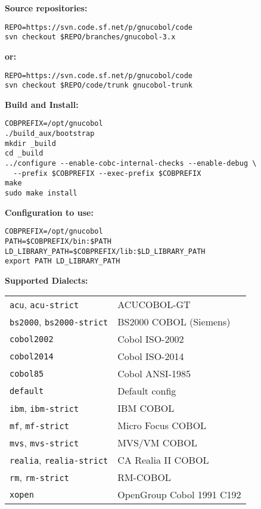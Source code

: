 \documentclass[10pt,landscape]{article}
\begin{document}
\begin{multicols}{3}
{{\bf Source repositories:}\vspace{-3mm}
\begin{verbatim}
REPO=https://svn.code.sf.net/p/gnucobol/code
svn checkout $REPO/branches/gnucobol-3.x
\end{verbatim}\vspace{-3mm}
{\bf or:}\vspace{-3mm}
\begin{verbatim}
REPO=https://svn.code.sf.net/p/gnucobol/code
svn checkout $REPO/code/trunk gnucobol-trunk
\end{verbatim}\vspace{-2mm}
{\bf Build and Install:}\vspace{-3mm}
\begin{verbatim}
COBPREFIX=/opt/gnucobol
./build_aux/bootstrap
mkdir _build
cd _build
../configure --enable-cobc-internal-checks --enable-debug \
  --prefix $COBPREFIX --exec-prefix $COBPREFIX
make
sudo make install
\end{verbatim}\vspace{-2mm}
{\bf Configuration to use:}\vspace{-3mm}
\begin{verbatim}
COBPREFIX=/opt/gnucobol
PATH=$COBPREFIX/bin:$PATH
LD_LIBRARY_PATH=$COBPREFIX/lib:$LD_LIBRARY_PATH
export PATH LD_LIBRARY_PATH
\end{verbatim}
{\bf Supported Dialects:}\\
\begin{tabular}{ll}
\verb+acu+, \verb+acu-strict+ & ACUCOBOL-GT \\
\verb+bs2000+, \verb+bs2000-strict+ & BS2000 COBOL (Siemens) \\
\verb+cobol2002+ & Cobol ISO-2002 \\
\verb+cobol2014+ & Cobol ISO-2014 \\
\verb+cobol85+ & Cobol ANSI-1985 \\
\verb+default+ & Default config\\
\verb+ibm+, \verb+ibm-strict+ & IBM COBOL \\
\verb+mf+, \verb+mf-strict+ & Micro Focus COBOL  \\
\verb+mvs+, \verb+mvs-strict+ & MVS/VM COBOL \\
\verb+realia+, \verb+realia-strict+ & CA Realia II COBOL \\
\verb+rm+, \verb+rm-strict+ & RM-COBOL \\
\verb+xopen+ & OpenGroup Cobol 1991 C192\\
\end{tabular}

}
\end{multicols}
\end{document}
